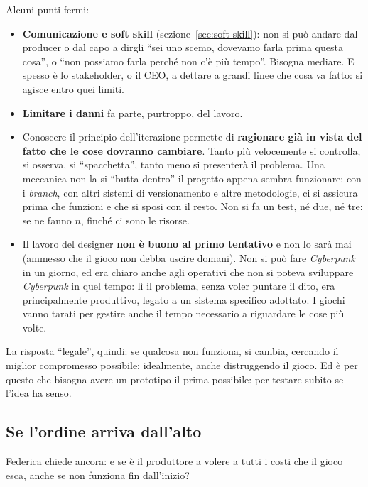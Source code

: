 Alcuni punti fermi:
\begin{itemize}
  \item \textbf{Comunicazione e soft skill} (sezione~\ref{sec:soft-skill}):
        non si può andare dal producer o dal capo a dirgli ``sei uno scemo,
        dovevamo farla prima questa cosa'', o ``non possiamo farla perché non
        c'è più tempo''. Bisogna mediare. E spesso è lo stakeholder, o il CEO,
        a dettare a grandi linee che cosa va fatto: si agisce entro quei
        limiti.
  \item \textbf{Limitare i danni} fa parte, purtroppo, del lavoro.
  \item Conoscere il principio dell'iterazione permette di \textbf{ragionare
        già in vista del fatto che le cose dovranno cambiare}. Tanto più
        velocemente si controlla, si osserva, si ``spacchetta'', tanto meno
        si presenterà il problema. Una meccanica non la si ``butta dentro'' il
        progetto appena sembra funzionare: con i \emph{branch}, con altri
        sistemi di versionamento e altre metodologie, ci si assicura prima che
        funzioni e che si sposi con il resto. Non si fa un test, né due, né
        tre: se ne fanno $n$, finché ci sono le risorse.
  \item Il lavoro del designer \textbf{non è buono al primo tentativo} e non
        lo sarà mai (ammesso che il gioco non debba uscire domani). Non si può
        fare \emph{Cyberpunk} in un giorno, ed era chiaro anche agli
        operativi che non si poteva sviluppare \emph{Cyberpunk} in quel tempo:
        lì il problema, senza voler puntare il dito, era principalmente
        produttivo, legato a un sistema specifico adottato. I giochi vanno
        tarati per gestire anche il tempo necessario a riguardare le cose più
        volte.
\end{itemize}
La risposta ``legale'', quindi: se qualcosa non funziona, si cambia, cercando
il miglior compromesso possibile; idealmente, anche distruggendo il gioco.
Ed è per questo che bisogna avere un prototipo il prima possibile: per
testare subito se l'idea ha senso.

\subsection{Se l'ordine arriva dall'alto}

Federica chiede ancora: e se è il produttore a volere a tutti i costi che il
gioco esca, anche se non funziona fin dall'inizio?

